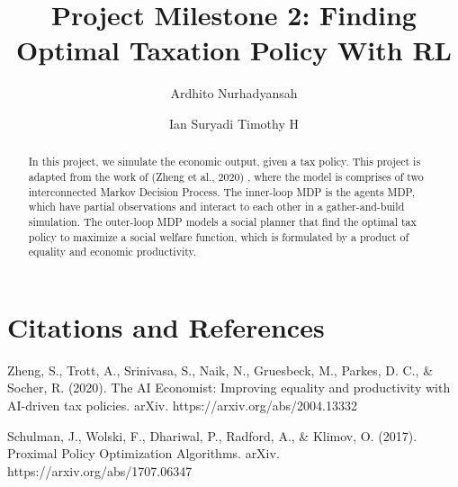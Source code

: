 \documentclass{article}
\title{Project Milestone 2: Finding Optimal Taxation Policy With RL}
\author[1]{Ardhito Nurhadyansah}
\author[2]{Ian Suryadi Timothy H}
\affil[1]{2106750206}
\affil[2]{2106750875}
\begin{document}
\maketitle

\begin{abstract}
    In this project, we simulate the economic output, given a tax policy. This project is adapted from the work of (Zheng et al., 2020) , where the model is comprises of two interconnected Markov Decision Process. The inner-loop MDP is the agents MDP, which have partial observations and interact to each other in a gather-and-build simulation. The outer-loop MDP models a social planner that find the optimal tax policy to maximize a social welfare function, which is formulated by a product of equality and economic productivity.
\end{abstract}
    











\section{Citations and References}


% 
% 
% 
Zheng, S., Trott, A., Srinivasa, S., Naik, N., Gruesbeck, M., Parkes, D. C., & Socher, R. (2020). The AI Economist: Improving equality and productivity with AI-driven tax policies. arXiv. https://arxiv.org/abs/2004.13332

Schulman, J., Wolski, F., Dhariwal, P., Radford, A., & Klimov, O. (2017). Proximal Policy Optimization Algorithms. arXiv. https://arxiv.org/abs/1707.06347
\end{document}
